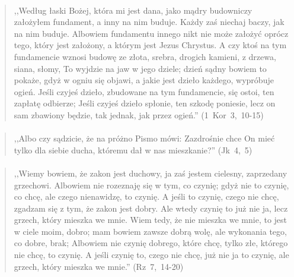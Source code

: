 \documentclass[10pt,a4paper,oneside]{article}
\begin{document}
\paragraph{}
\begin{quote}
,,Według łaski Bożej, która mi jest dana, jako mądry budowniczy założyłem fundament, a inny na nim buduje. Każdy zaś niechaj baczy, jak na nim buduje. Albowiem fundamentu innego nikt nie może założyć oprócz tego, który jest założony, a którym jest Jezus Chrystus. A czy ktoś na tym fundamencie wznosi budowę ze złota, srebra, drogich kamieni, z drzewa, siana, słomy, To wyjdzie na jaw w jego dziele; dzień sądny bowiem to pokaże, gdyż w ogniu się objawi, a jakie jest dzieło każdego, wypróbuje ogień. Jeśli czyjeś dzieło, zbudowane na tym fundamencie, się ostoi, ten zapłatę odbierze; Jeśli czyjeś dzieło spłonie, ten szkodę poniesie, lecz on sam zbawiony będzie, tak jednak, jak przez ogień.'' \mbox{(1 Kor 3, 10-15)}
\end{quote}
\paragraph{}
\begin{quote}
,,Albo czy sądzicie, że na próżno Pismo mówi: Zazdrośnie chce On mieć tylko dla siebie ducha, któremu dał w nas mieszkanie?'' \mbox{(Jk 4, 5)}
\end{quote}
\paragraph{}
\begin{quote}
,,Wiemy bowiem, że zakon jest duchowy, ja zaś jestem cielesny, zaprzedany grzechowi. Albowiem nie rozeznaję się w tym, co czynię; gdyż nie to czynię, co chcę, ale czego nienawidzę, to czynię. A jeśli to czynię, czego nie chcę, zgadzam się z tym, że zakon jest dobry. Ale wtedy czynię to już nie ja, lecz grzech, który mieszka we mnie. Wiem tedy, że nie mieszka we mnie, to jest w ciele moim, dobro; mam bowiem zawsze dobrą wolę, ale wykonania tego, co dobre, brak; Albowiem nie czynię dobrego, które chcę, tylko złe, którego nie chcę, to czynię. A jeśli czynię to, czego nie chcę, już nie ja to czynię, ale grzech, który mieszka we mnie.'' \mbox{(Rz 7, 14-20)}
\end{quote}
\end{document}
